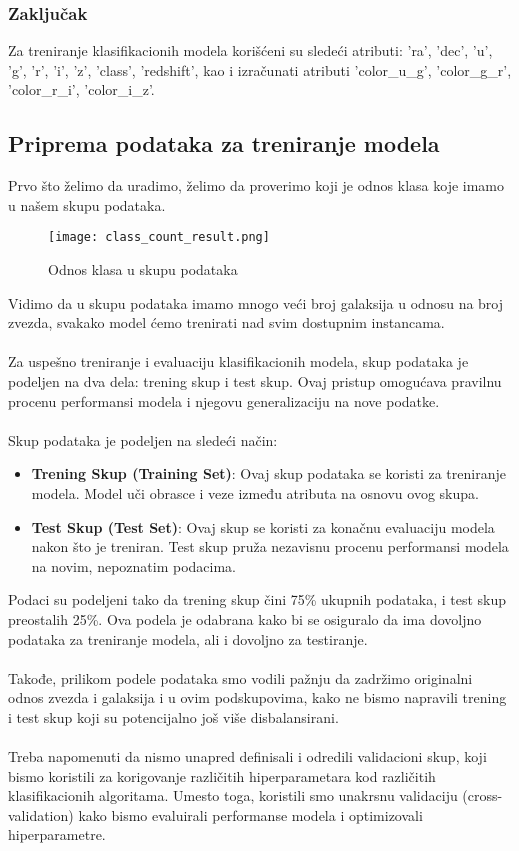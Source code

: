 \documentclass[a4paper,12pt]{article}
\begin{document}
\subsubsection{Zaključak}
Za treniranje klasifikacionih modela korišćeni su sledeći atributi: 'ra', 'dec', 'u', 'g', 'r', 'i', 'z', 'class', 'redshift', kao i izračunati atributi 'color\_u\_g', 'color\_g\_r', 'color\_r\_i', 'color\_i\_z'.

\clearpage


\subsection{Priprema podataka za treniranje modela}

Prvo što želimo da uradimo, želimo da proverimo koji je odnos klasa koje imamo u našem skupu podataka.

\begin{figure}[H]
\centering
\texttt{[image: class\_count\_result.png]}
\caption{Odnos klasa u skupu podataka}
\label{fig:sql_query}
\end{figure}

Vidimo da u skupu podataka imamo mnogo veći broj galaksija u odnosu na broj zvezda, svakako model ćemo trenirati nad svim dostupnim instancama.
\\\\Za uspešno treniranje i evaluaciju klasifikacionih modela, skup podataka je podeljen na dva dela: trening skup i test skup. Ovaj pristup omogućava pravilnu procenu performansi modela i njegovu generalizaciju na nove podatke.
\\\\Skup podataka je podeljen na sledeći način:
\begin{itemize}
    \item \textbf{Trening Skup (Training Set)}: Ovaj skup podataka se koristi za treniranje modela. Model uči obrasce i veze između atributa na osnovu ovog skupa.
    \item \textbf{Test Skup (Test Set)}: Ovaj skup se koristi za konačnu evaluaciju modela nakon što je treniran. Test skup pruža nezavisnu procenu performansi modela na novim, nepoznatim podacima.
\end{itemize}

Podaci su podeljeni tako da trening skup čini 75\% ukupnih podataka, i test skup preostalih 25\%. Ova podela je odabrana kako bi se osiguralo da ima dovoljno podataka za treniranje modela, ali i dovoljno za testiranje.\\\\
Takođe, prilikom podele podataka smo vodili pažnju da zadržimo originalni odnos zvezda i galaksija i u ovim podskupovima, kako ne bismo napravili trening i test skup koji su potencijalno još više disbalansirani.\\\\
Treba napomenuti da nismo unapred definisali i odredili validacioni skup, koji bismo koristili za korigovanje različitih hiperparametara kod različitih klasifikacionih algoritama. Umesto toga, koristili smo unakrsnu validaciju (cross-validation) kako bismo evaluirali performanse modela i optimizovali hiperparametre.
\end{document}
